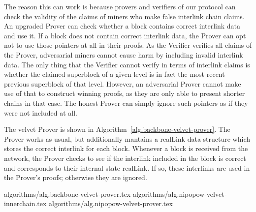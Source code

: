The reason this can work is because provers and verifiers of our protocol can
check the validity of the claims of miners who make false interlink chain
claims. An upgraded Prover can check whether a block contains correct interlink
data and use it. If a block does not contain correct interlink data, the Prover
can opt not to use those pointers at all in their proofs. As the Verifier
verifies all claims of the Prover, adversarial miners cannot cause harm by
including invalid interlink data. The only thing that the Verifier cannot
verify in terms of interlink claims is whether the claimed superblock of a
given level is in fact the most recent previous superblock of that level.
However, an adversarial Prover cannot make use of that to construct winning
proofs, as they are only able to present shorter chains in that case. The
honest Prover can simply ignore such pointers as if they were not included at
all.

The velvet Prover is shown in Algorithm~\ref{alg.backbone-velvet-prover}. The
Prover works as usual, but additionally mantains a realLink data structure
which stores the correct interlink for each block. Whenever a block is received
from the network, the Prover checks to see if the interlink included in the block is
correct and corresponds to their internal state realLink. If so, these
interlinks are used in the Prover's proofs; otherwise they are ignored.

{algorithms/alg.backbone-velvet-prover.tex}
{algorithms/alg.nipopow-velvet-innerchain.tex}
{algorithms/alg.nipopow-velvet-prover.tex}
